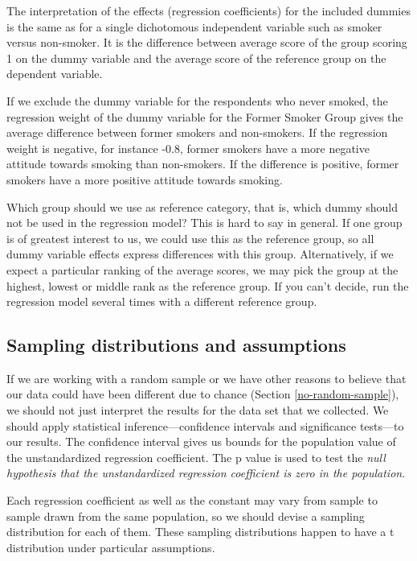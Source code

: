 \documentclass[a4paper]{book}
\theoremstyle{definition}
\theoremstyle{definition}
\theoremstyle{definition}
\theoremstyle{remark}
\begin{document}
The interpretation of the effects (regression coefficients) for the
included dummies is the same as for a single dichotomous independent
variable such as smoker versus non-smoker. It is the difference between
average score of the group scoring 1 on the dummy variable and the
average score of the reference group on the dependent variable.

If we exclude the dummy variable for the respondents who never smoked,
the regression weight of the dummy variable for the Former Smoker Group
gives the average difference between former smokers and non-smokers. If
the regression weight is negative, for instance -0.8, former smokers
have a more negative attitude towards smoking than non-smokers. If the
difference is positive, former smokers have a more positive attitude
towards smoking.

Which group should we use as reference category, that is, which dummy
should not be used in the regression model? This is hard to say in
general. If one group is of greatest interest to us, we could use this
as the reference group, so all dummy variable effects express
differences with this group. Alternatively, if we expect a particular
ranking of the average scores, we may pick the group at the highest,
lowest or middle rank as the reference group. If you can't decide, run
the regression model several times with a different reference group.

\subsection{Sampling distributions and
assumptions}\label{regr-inference}

If we are working with a random sample or we have other reasons to
believe that our data could have been different due to chance (Section
\ref{no-random-sample}), we should not just interpret the results for
the data set that we collected. We should apply statistical
inference---confidence intervals and significance tests---to our
results. The confidence interval gives us bounds for the population
value of the unstandardized regression coefficient. The p value is used
to test the \emph{null hypothesis that the unstandardized regression
coefficient is zero in the population}.

Each regression coefficient as well as the constant may vary from sample
to sample drawn from the same population, so we should devise a sampling
distribution for each of them. These sampling distributions happen to
have a t distribution under particular assumptions.
\end{document}
